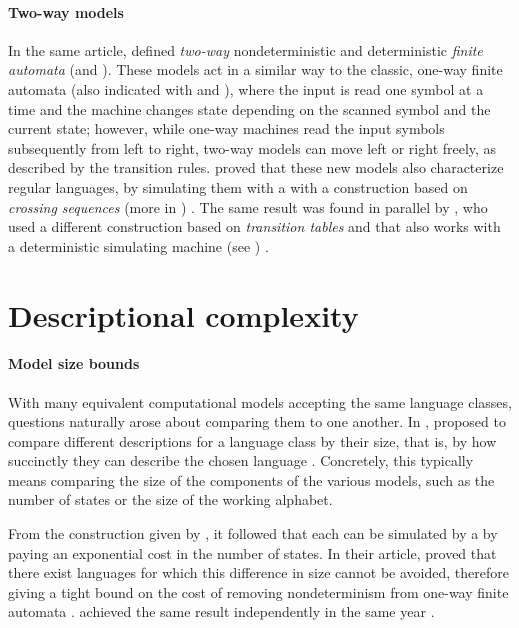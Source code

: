 \paragraph{Two-way models} In the same article, \citeauthor{RabSco59} defined \emph{two-way} nondeterministic and deterministic \emph{finite automata} (\TNFA and \TDFA).
These models act in a similar way to the classic, one-way finite automata (also indicated with \ONFA and \ODFA), where the input is read one symbol at a time and the machine changes state depending on the scanned symbol and the current state; however, while one-way machines read the input symbols subsequently from left to right, two-way models can move left or right freely, as described by the transition rules.
\citeauthor{RabSco59} proved that these new models also characterize regular languages, by simulating them with a \ONFA with a construction based on \emph{crossing sequences} (more in ) \cite{RabSco59}.
The same result was found in parallel by \citeauthor{She59}, who used a different construction based on \emph{transition tables} and that also works with a deterministic simulating machine (see ) \cite{She59}.



\section{Descriptional complexity}\label{sec:context-descrcomp}

\paragraph{Model size bounds} With many equivalent computational models accepting the same language classes, questions naturally arose about comparing them to one another.
In \citeyear{MeyFis71}, \citeauthor{MeyFis71} proposed to compare different descriptions for a language class by their size, that is, by how succinctly they can describe the chosen language \cite{MeyFis71}.
Concretely, this typically means comparing the size of the components of the various models, such as the number of states or the size of the working alphabet.

From the construction given by \citeauthor{RabSco59}, it followed that each \NFA can be simulated by a \DFA by paying an exponential cost in the number of states.
In their article, \citeauthor{MeyFis71} proved that there exist languages for which this difference in size cannot be avoided, therefore giving a tight bound on the cost of removing nondeterminism from one-way finite automata \cite{MeyFis71}.
\citeauthor{Moo71} achieved the same result independently in the same year \cite{Moo71}.

